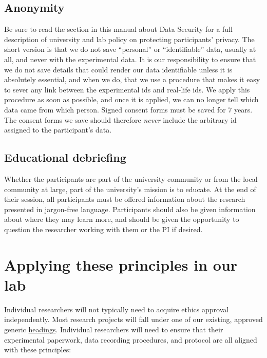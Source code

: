 \documentclass[
  12pt,
]{book}
\begin{document}
\subsection{Anonymity}\label{anonymity}

Be sure to read the section in this manual about Data Security for a full description of university and lab policy on protecting participants' privacy. The short version is that we do not save ``personal'' or ``identifiable'' data, usually at all, and never with the experimental data. It is our responsibility to ensure that we do not save details that could render our data identifiable unless it is absolutely essential, and when we do, that we use a procedure that makes it easy to sever any link between the experimental ids and real-life ids. We apply this procedure as soon as possible, and once it is applied, we can no longer tell which data came from which person. Signed consent forms must be saved for 7 years. The consent forms we save should therefore \emph{never} include the arbitrary id assigned to the participant's data.

\subsection{Educational debriefing}\label{educational-debriefing}

Whether the participants are part of the university community or from the local community at large, part of the university's mission is to educate. At the end of their session, all participants must be offered information about the research presented in jargon-free language. Participants should also be given information about where they may learn more, and should be given the opportunity to question the researcher working with them or the PI if desired.

\section{Applying these principles in our lab}\label{applying-these-principles-in-our-lab}

Individual researchers will not typically need to acquire ethics approval independently. Most research projects will fall under one of our existing, approved generic \hyperref[ethics-approvals-currently-in-place]{headings}. Individual researchers will need to ensure that their experimental paperwork, data recording procedures, and protocol are all aligned with these principles:
\end{document}
